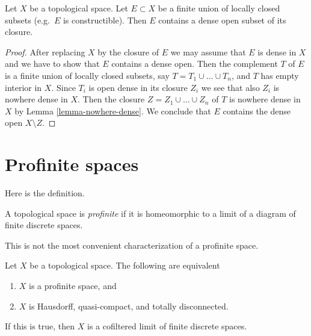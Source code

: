 \begin{lemma}
\label{lemma-dense-in-constructible}
Let $X$ be a topological space. Let $E \subset X$ be a finite union
of locally closed subsets (e.g.\ $E$ is constructible). Then $E$
contains a dense open subset of its closure.
\end{lemma}

\begin{proof}
After replacing $X$ by the closure of $E$ we may assume that $E$
is dense in $X$ and we have to show that $E$ contains a dense open.
Then the complement $T$ of $E$ is a finite union of locally closed subsets,
say $T = T_1 \cup \ldots \cup T_n$, and $T$ has empty interior in $X$.
Since $T_i$ is open dense in its closure $Z_i$ we see that also
$Z_i$ is nowhere dense in $X$. Then the closure $Z = Z_1 \cup \ldots \cup Z_n$
of $T$ is nowhere dense in $X$ by Lemma \ref{lemma-nowhere-dense}.
We conclude that $E$ contains the dense open $X \setminus Z$.
\end{proof}






\section{Profinite spaces}
\label{section-profinite}

\noindent
Here is the definition.

\begin{definition}
\label{definition-profinite}
A topological space is {\it profinite} if it is homeomorphic to a limit
of a diagram of finite discrete spaces.
\end{definition}

\noindent
This is not the most convenient characterization of a profinite space.

\begin{lemma}
\label{lemma-profinite}
Let $X$ be a topological space.
The following are equivalent
\begin{enumerate}
\item $X$ is a profinite space, and
\item $X$ is Hausdorff, quasi-compact, and totally disconnected.
\end{enumerate}
If this is true, then $X$ is a cofiltered limit of finite discrete
spaces.
\end{lemma}

